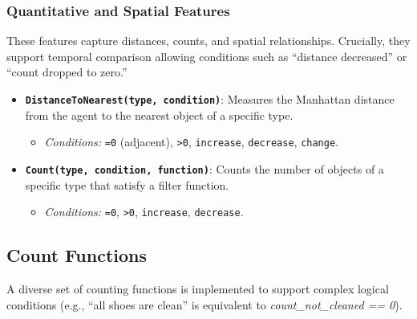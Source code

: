 \subsubsection{Quantitative and Spatial Features}
These features capture distances, counts, and spatial relationships. Crucially, they support temporal comparison allowing conditions such as ``distance decreased'' or ``count dropped to zero.''

\begin{itemize}[leftmargin=*]
\item \textbf{\texttt{DistanceToNearest(type, condition)}}: Measures the Manhattan distance from the agent to the nearest object of a specific type.
\begin{itemize}[leftmargin=*]
\item \textit{Conditions:} \texttt{=0} (adjacent), \texttt{>0}, \texttt{increase}, \texttt{decrease}, \texttt{change}.
\end{itemize}
\item \textbf{\texttt{Count(type, condition, function)}}: Counts the number of objects of a specific type that satisfy a filter function.
\begin{itemize}
\item \textit{Conditions:} \texttt{=0}, \texttt{>0}, \texttt{increase}, \texttt{decrease}.
\end{itemize}
\end{itemize}

\subsection{Count Functions}
A diverse set of counting functions is implemented to support complex logical conditions (e.g., ``all shoes are clean'' is equivalent to \emph{count\_not\_cleaned == 0}).

